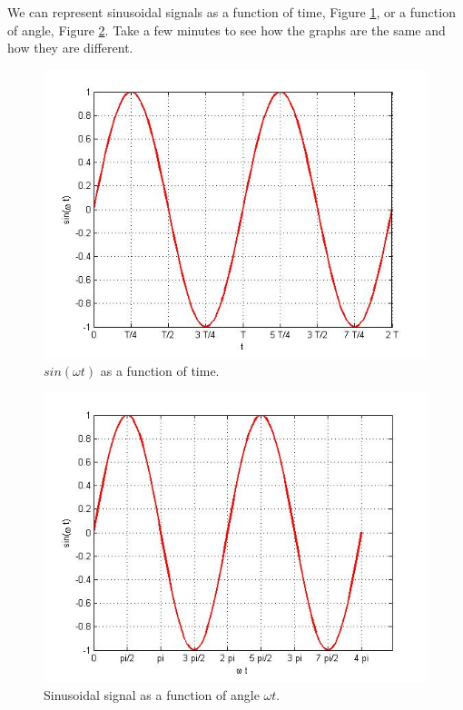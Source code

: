 \documentclass{ximera}
\begin{document}
\begin{definition}
We can represent sinusoidal signals as a function of time, Figure \ref{sin}, or a function of angle, Figure \ref{sinPh}. Take a few minutes to see how the graphs are the same and how they are different.



\begin{figure}[htpb]
\includegraphics[scale=0.4]{jpg/cpef1.jpg}
\caption{$sin ( \omega t)$ as a function of time.} \label{sin}
\end{figure}




\begin{figure}[htpb]
\includegraphics[scale=0.4]{jpg/cpef3.jpg}
\caption{Sinusoidal signal as a function of angle $\omega t$.}
\label{sinPh}
\end{figure}

\end{definition}
\end{document}

